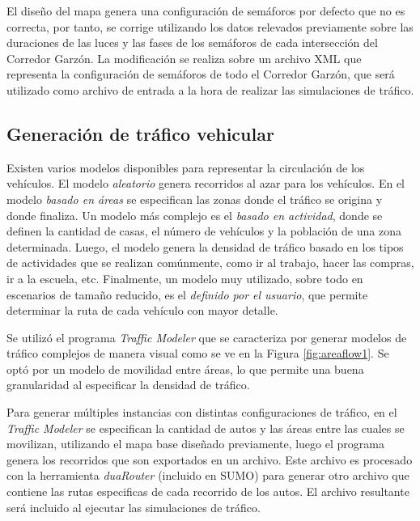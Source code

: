 El diseño del mapa genera una configuración de semáforos por defecto que no es correcta, por tanto, se corrige utilizando los datos relevados previamente sobre las duraciones de las luces y las fases de los semáforos de cada intersección del Corredor Garzón. La modificación se realiza sobre un archivo XML que representa la configuración de semáforos de todo el Corredor Garzón, que será utilizado como archivo de entrada a la hora de realizar las simulaciones de tráfico.

\subsection{Generación de tráfico vehicular}

Existen varios modelos disponibles para representar la circulación de los vehículos. El modelo \emph{aleatorio} genera recorridos al azar para los vehículos. En el modelo \emph{basado en áreas} se especifican las zonas donde el tráfico se origina y donde finaliza. Un modelo más complejo es el \emph{basado en actividad}, donde se definen la cantidad de casas, el número de vehículos y la población de una zona determinada. Luego, el modelo genera la densidad de tráfico basado en los tipos de actividades que se realizan comúnmente, como ir al trabajo, hacer las compras, ir a la escuela, etc. Finalmente, un modelo muy utilizado, sobre todo en escenarios de tamaño reducido, es el \emph{definido por el usuario}, que permite determinar la ruta de cada vehículo con mayor detalle.

Se utilizó el programa \emph{Traffic Modeler} que se caracteriza por generar modelos de tráfico complejos de manera visual como se ve en la Figura \ref{fig:areaflow1}. Se optó por un modelo de movilidad entre áreas, lo que permite una buena granularidad al especificar la densidad de tráfico. 

Para generar múltiples instancias con distintas configuraciones de tráfico, en el \emph{Traffic Modeler} se especifican la cantidad de autos y las áreas entre las cuales se movilizan, utilizando el mapa base diseñado previamente, luego el programa genera los recorridos que son exportados en un archivo. Este archivo es procesado con la herramienta \emph{duaRouter} (incluido en SUMO) para generar otro archivo que contiene las rutas especificas de cada recorrido de los autos. El archivo resultante será incluido al ejecutar las simulaciones de tráfico.





